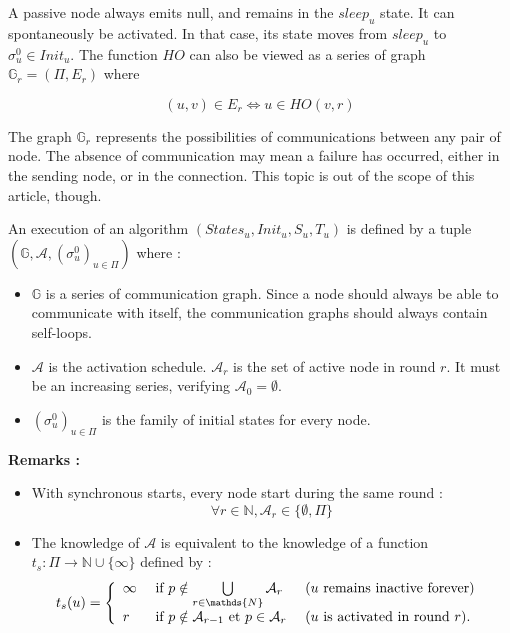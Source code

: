 \documentclass{article}
\newcommand{\ts}{t_{s}}
\begin{document}
A passive node always emits null, and remains in the $sleep_u$ state.
It can spontaneously be activated. In that case, its state moves from $sleep_u$ to $\sigma^0_u \in Init_u$.
The function $HO$ can also be viewed as a series of graph $\mathds{G}_r = (\Pi, E_r)$ where

$$(u, v) \in E_r \Leftrightarrow u \in HO(v, r)$$

The graph $\mathds{G}_r$ represents the possibilities of communications between any pair of node.
The absence of communication may mean a failure has occurred, either in the sending node, or in the connection.
This topic is out of the scope of this article, though.

An execution of an algorithm $(States_u, Init_u, S_u, T_u)$ is defined by a tuple
$(\mathds{G}, \mathcal{A}, (\sigma^0_u)_{u \in \Pi})$ where :

\begin{itemize}
	\item $\mathds{G}$ is a series of communication graph. Since a node should always be able to communicate 
		with itself, the communication graphs should always contain self-loops.
	\item $\mathcal{A}$ is the activation schedule. $\mathcal{A}_r$ is the set of active node in round $r$.
		It must be an increasing series, verifying $\mathcal{A}_0 = \emptyset$.
	\item $(\sigma^0_u)_{u \in \Pi}$ is the family of initial states for every node.
\end{itemize}

\textbf{Remarks :}

\begin{itemize}
	\item With synchronous starts, every node start during the same round : 
		$$\forall r \in \mathds{N}, \mathcal{A}_r \in \{\emptyset, \Pi\}$$

	\item The knowledge of $\mathcal{A}$ is equivalent to the knowledge of a function
		$\ts : \Pi \rightarrow \mathds{N} \cup \{\infty\}$ defined by :
		$$\ts(u) = \left \{ \begin{array}{l ll}
		  \infty & \mbox{ if  } p \notin \bigcup\limits_{r \in \mathds{N}}  \mathcal{A}_r & 
			  \mbox { ($u$ remains inactive forever) } \\
		  r  & \mbox{ if  } p \notin \mathcal{A}_{r-1} \mbox{ et } p \in \mathcal{A}_{r}  &
			  \mbox{ ($u$ is activated in round $r$)}.
		  \end{array} \right.$$

\end{itemize}
\end{document}
